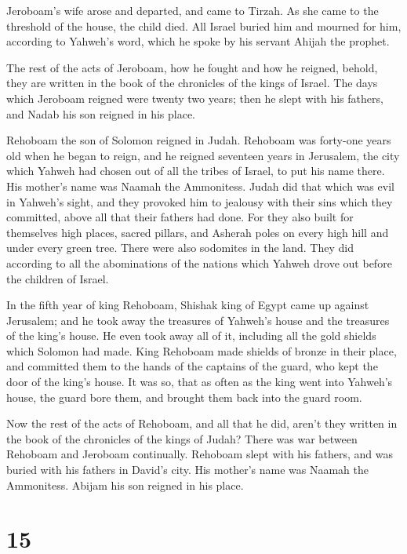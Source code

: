  Jeroboam's wife arose and departed, and came to Tirzah. As
she came to the threshold of the house, the child died. 
All Israel buried him and mourned for him, according to Yahweh's word,
which he spoke by his servant Ahijah the prophet.

 The rest of the acts of Jeroboam, how he fought and how he
reigned, behold, they are written in the book of the chronicles of the
kings of Israel.  The days which Jeroboam reigned were
twenty two years; then he slept with his fathers, and Nadab his son
reigned in his place.

 Rehoboam the son of Solomon reigned in Judah. Rehoboam was
forty-one years old when he began to reign, and he reigned seventeen
years in Jerusalem, the city which Yahweh had chosen out of all the
tribes of Israel, to put his name there. His mother's name was Naamah
the Ammonitess.  Judah did that which was evil in Yahweh's
sight, and they provoked him to jealousy with their sins which they
committed, above all that their fathers had done.  For they
also built for themselves high places, sacred pillars, and Asherah poles
on every high hill and under every green tree.  There were
also sodomites in the land. They did according to all the abominations
of the nations which Yahweh drove out before the children of Israel.

 In the fifth year of king Rehoboam, Shishak king of Egypt
came up against Jerusalem;  and he took away the treasures
of Yahweh's house and the treasures of the king's house. He even took
away all of it, including all the gold shields which Solomon had made.
 King Rehoboam made shields of bronze in their place, and
committed them to the hands of the captains of the guard, who kept the
door of the king's house.  It was so, that as often as the
king went into Yahweh's house, the guard bore them, and brought them
back into the guard room.

 Now the rest of the acts of Rehoboam, and all that he did,
aren't they written in the book of the chronicles of the kings of Judah?
 There was war between Rehoboam and Jeroboam continually.
 Rehoboam slept with his fathers, and was buried with his
fathers in David's city. His mother's name was Naamah the Ammonitess.
Abijam his son reigned in his place.

\hypertarget{section-14}{%
\section{15}\label{section-14}}

